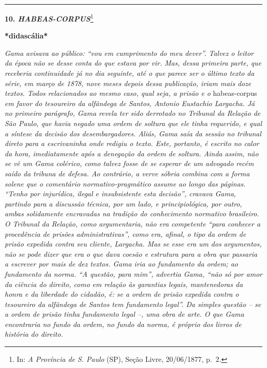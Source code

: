 \begin{center}\rule{0.5\linewidth}{\linethickness}\end{center}

\textbf{10. \emph{HABEAS-CORPUS}}\footnote{In: \emph{A Província de S.
  Paulo} (SP), Seção Livre, 20/06/1877, p.~2.}

\textbf{*didascália*}

\emph{Gama avisava ao público: ``vou em cumprimento do meu dever''.
Talvez o leitor da época não se desse conta do que estava por vir. Mas,
dessa primeira parte, que receberia continuidade já no dia seguinte, até
o que parece ser o último texto da série, em março de 1878, nove meses
depois dessa publicação, iriam mais doze textos. Todos relacionados ao
mesmo caso, qual seja, a prisão e o} habeas-corpus \emph{em favor do
tesoureiro da alfândega de Santos, Antonio Eustachio Largacha. Já no
primeiro parágrafo, Gama revela ter sido derrotado no Tribunal da
Relação de São Paulo, que havia negado uma ordem de soltura que ele
tinha requerido, e qual a síntese da decisão dos desembargadores. Aliás,
Gama saía da sessão no tribunal direto para a escrivaninha onde redigiu
o texto. Este, portanto, é escrito no calor da hora, imediatamente após
a denegação da ordem de soltura. Ainda assim, não se vê um Gama
colérico, como talvez fosse de se esperar de um advogado recém saído da
tribuna de defesa. Ao contrário, a verve sóbria combina com a forma
solene que o comentário normativo-pragmático assume ao longo das
páginas. ``Tenho por injurídica, ilegal e insubsistente esta decisão'',
cravava Gama, partindo para a discussão técnica, por um lado, e
principiológica, por outro, ambas solidamente encravadas na tradição do
conhecimento normativo brasileiro. O Tribunal da Relação, como
argumentaria, não era competente ``para conhecer a procedência de
prisões administrativas'', como era, afinal, o tipo da ordem de prisão
expedida contra seu cliente, Largacha. Mas se esse era um dos
argumentos, não se pode dizer que era o que dava coesão e estrutura para
a obra que passaria a escrever por mais de dez textos. Gama iria ao
fundamento da ordem; ao fundamento da norma. ``A questão, para mim'',
advertia Gama, ``não só por amor da ciência do direito, como em relação
às garantias legais, mantenedoras da honra e da liberdade do cidadão, é:
se a ordem de prisão expedida contra o tesoureiro da alfândega de Santos
tem fundamento legal''. Da simples questão -- se a ordem de prisão tinha
fundamento legal --, uma obra de arte. O que Gama encontraria no fundo
da ordem, no fundo da norma, é próprio dos livros de história do
direito.}

